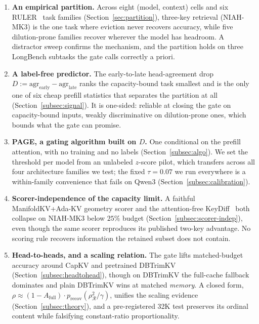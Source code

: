 \documentclass{article}
\newcommand{\method}{PAGE\xspace}
\begin{document}
\begin{enumerate}
\item \textbf{An empirical partition.} Across eight (model, context) cells and
six RULER~\citep{arxiv240406654} task families (Section~\ref{sec:partition}),
three-key retrieval (NIAH-MK3) is the one task where eviction never recovers
accuracy, while five dilution-prone families recover wherever the model has
headroom. A distractor sweep confirms the mechanism, and the partition holds on
three LongBench subtasks the gate calls correctly a priori.

\item \textbf{A label-free predictor.} The early-to-late head-agreement drop
$D := \mathrm{agr}_{\text{early}} - \mathrm{agr}_{\text{late}}$ ranks the
capacity-bound task smallest and is the only one of six cheap prefill
statistics that separates the partition at all (Section~\ref{subsec:signal}).
It is one-sided: reliable at closing the gate on capacity-bound inputs, weakly
discriminative on dilution-prone ones, which bounds what the gate can promise.

\item \textbf{\method, a gating algorithm built on $D$.} One conditional on
the prefill attention, with no training and no labels
(Section~\ref{subsec:algo}). We set the threshold per model from an unlabeled
$z$-score pilot, which transfers across all four architecture families we test;
the fixed $\tau = 0.07$ we run everywhere is a within-family convenience that
fails on Qwen3 (Section~\ref{subsec:calibration}).

\item \textbf{Scorer-independence of the capacity limit.} A faithful
ManifoldKV+Ada-KV geometry scorer and the attention-free
KeyDiff~\citep{keydiff} both collapse on NIAH-MK3 below $25\%$ budget
(Section~\ref{subsec:scorer-indep}), even though the same scorer reproduces its
published two-key advantage. No scoring rule recovers information the retained
subset does not contain.

\item \textbf{Head-to-heads, and a scaling relation.} The gate lifts
matched-budget accuracy around CapKV and pretrained DBTrimKV
(Section~\ref{subsec:headtohead}), though on DBTrimKV the full-cache fallback
dominates and plain DBTrimKV wins at matched \emph{memory}. A closed form,
$\rho \approx (1 - A_{\mathrm{full}}) \cdot
p_{\mathrm{recov}}(\rho_{\mathcal{R}}^2/\gamma)$, unifies the scaling evidence
(Section~\ref{subsec:theory}), and a pre-registered 32K test preserves its
ordinal content while falsifying constant-ratio proportionality.
\end{enumerate}
\end{document}
